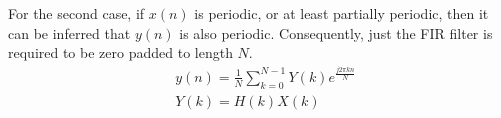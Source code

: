 For the second case, if $x(n)$ is periodic, or at least partially periodic, 
then it can be inferred that $y(n)$ is also periodic. Consequently, 
just the FIR filter is required to be zero padded to length $N$. 
\begin{equation}
  \label{eq:perprefix}
  \begin{aligned}
    & y(n) = \frac{1}{N}\sum_{k=0}^{N-1}Y(k)e^{\frac{j2\pi k n}{N}}\\
& Y(k) = H(k)X(k) \\
  \end{aligned}
\end{equation}